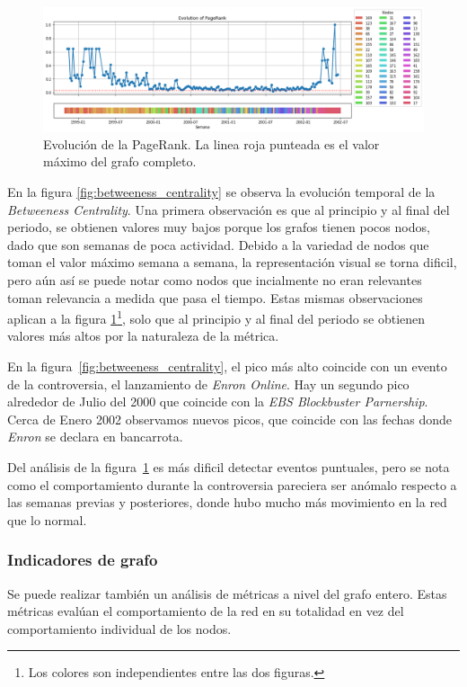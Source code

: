 \documentclass{article}
\begin{document}
\begin{figure}[htb]
    \centering
    \includegraphics[width=\linewidth]{imagenes/ej1/pagerank.png}
    \caption{Evolución de la PageRank. La linea roja punteada es el valor máximo del grafo completo.}
    \label{fig:page_rank}
\end{figure}

En la figura \ref{fig:betweeness_centrality} se observa la evolución temporal de la \textit{Betweeness Centrality}. Una primera observación es que al principio y al final del periodo, se obtienen valores muy bajos porque los grafos tienen pocos nodos, dado que son semanas de poca actividad.
Debido a la variedad de nodos que toman el valor máximo semana a semana, la representación visual se torna dificil, pero aún así se puede notar como nodos que incialmente no eran relevantes toman relevancia a medida que pasa el tiempo. Estas mismas observaciones aplican a la figura \ref{fig:page_rank}\footnote{Los colores son independientes entre las dos figuras.}, solo que al principio y al final del periodo se obtienen valores más altos por la naturaleza de la métrica.

En la figura~\ref{fig:betweeness_centrality}, el pico más alto coincide con un evento de la controversia, el lanzamiento de \emph{Enron Online}. Hay un segundo pico alrededor de Julio del 2000 que coincide con la \emph{EBS Blockbuster Parnership}. Cerca de Enero 2002 observamos nuevos picos, que coincide con las fechas donde \emph{Enron} se declara en bancarrota.

Del análisis de la figura~\ref{fig:page_rank} es más dificil detectar eventos puntuales, pero se nota como el comportamiento durante la controversia pareciera ser anómalo respecto a las semanas previas y posteriores, donde hubo mucho más movimiento en la red que lo normal.

\subsubsection{Indicadores de grafo}

Se puede realizar también un análisis de métricas a nivel del grafo entero. Estas métricas evalúan el comportamiento de la red en su totalidad en vez del comportamiento individual de los nodos.
\end{document}
